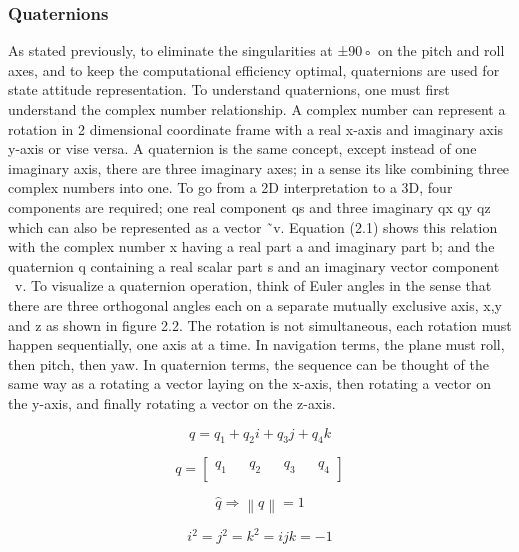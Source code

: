 \subsubsection{Quaternions}

As stated previously, to eliminate the singularities at ±90◦ on the pitch and roll axes, and
to keep the computational efficiency optimal, quaternions are used for state attitude representation. To understand quaternions, one must first understand the complex number
relationship. A complex number can represent a rotation in 2 dimensional coordinate frame
with a real x-axis and imaginary axis y-axis or vise versa.
A quaternion is the same concept, except instead of one imaginary axis, there are three
imaginary axes; in a sense its like combining three complex numbers into one. To go from a
2D interpretation to a 3D, four components are required; one real component qs and three
imaginary qx qy qz which can also be represented as a vector ˜v. Equation (2.1) shows this
relation with the complex number x having a real part a and imaginary part b; and the
quaternion q containing a real scalar part s and an imaginary vector component ~v.
To visualize a quaternion operation, think of Euler angles in the sense that there are
three orthogonal angles each on a separate mutually exclusive axis, x,y and z as shown in
figure 2.2. The rotation is not simultaneous, each rotation must happen sequentially, one
axis at a time. In navigation terms, the plane must roll, then pitch, then yaw. In quaternion
terms, the sequence can be thought of the same way as a rotating a vector laying on the
x-axis, then rotating a vector on the y-axis, and finally rotating a vector on the z-axis.

\begin{equation}
    q = q_1 + q_2 i + q_3 j + q_4 k
\end{equation}

\begin{equation}
    q =     \begin{bmatrix}
        q_1 &  & q_2 &  & q_3 &  & q_4 \\
    \end{bmatrix}
\end{equation}

\begin{equation}
    \hat{q} \Longrightarrow \left\lVert q\right\rVert =1
\end{equation}

\begin{equation}
    i^2=j^2=k^2=ijk=-1
\end{equation}

